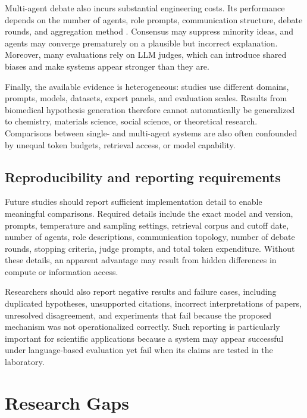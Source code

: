\documentclass[11pt]{article}
\begin{document}
Multi-agent debate also incurs substantial engineering costs. Its performance depends on the
number of agents, role prompts, communication structure, debate rounds, and aggregation method
\cite{smit2024mad}. Consensus may suppress minority ideas, and agents may converge prematurely
on a plausible but incorrect explanation. Moreover, many evaluations rely on LLM judges, which
can introduce shared biases and make systems appear stronger than they are.

Finally, the available evidence is heterogeneous: studies use different domains, prompts, models,
datasets, expert panels, and evaluation scales. Results from biomedical hypothesis generation
therefore cannot automatically be generalized to chemistry, materials science, social science, or
theoretical research. Comparisons between single- and multi-agent systems are also often
confounded by unequal token budgets, retrieval access, or model capability.

\subsection{Reproducibility and reporting requirements}
\label{subsec:reproducibility}

Future studies should report sufficient implementation detail to enable meaningful comparisons.
Required details include the exact model and version, prompts, temperature and sampling settings,
retrieval corpus and cutoff date, number of agents, role descriptions, communication topology,
number of debate rounds, stopping criteria, judge prompts, and total token expenditure. Without
these details, an apparent advantage may result from hidden differences in compute or information
access.

Researchers should also report negative results and failure cases, including duplicated hypotheses,
unsupported citations, incorrect interpretations of papers, unresolved disagreement, and
experiments that fail because the proposed mechanism was not operationalized correctly. Such
reporting is particularly important for scientific applications because a system may appear
successful under language-based evaluation yet fail when its claims are tested in the laboratory.

\section{Research Gaps}
\label{sec:research-gaps}
\end{document}
